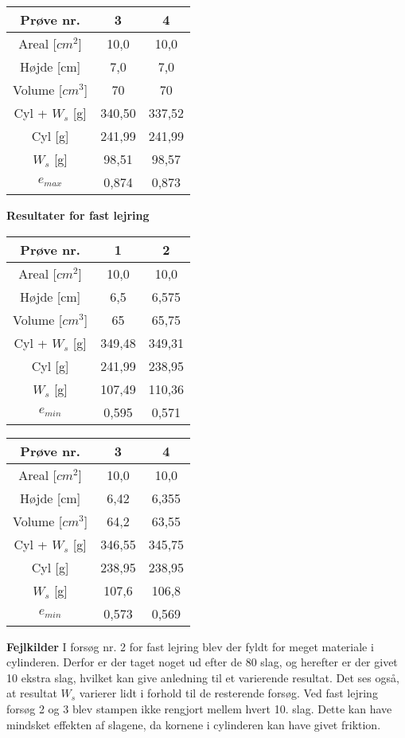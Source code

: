 \begin{center}
	\begin{tabular}{ |c|c|c| } 
		\hline
		Prøve nr. & 3 & 4 \\	\hline
		Areal [$cm^2$] & 10,0 & 10,0 \\ \hline
		Højde [cm] & 7,0 & 7,0 \\ \hline
		Volume [$cm^3$] & 70 & 70 \\ \hline
		Cyl + $W_s$ [g] & 340,50 & 337,52 \\ \hline
		Cyl [g] & 241,99 & 241,99 \\ \hline
		$W_s$ [g] & 98,51 & 98,57 \\ \hline
		$e_{max}$ & 0,874 & 0,873\\ \hline
	\end{tabular}
\end{center}

\textbf{Resultater for fast lejring}
\begin{center}
	\begin{tabular}{ |c|c|c| } 
		\hline
		Prøve nr. & 1 & 2 \\	\hline 
		Areal [$cm^2$] & 10,0 & 10,0 \\ \hline
		Højde [cm] & 6,5 & 6,575 \\ \hline
		Volume [$cm^3$] & 65 & 65,75 \\ \hline
		Cyl + $W_s$ [g] & 349,48 & 349,31 \\ \hline
		Cyl [g] & 241,99 & 238,95 \\ \hline
		$W_s$ [g] & 107,49 & 110,36 \\ \hline
		$e_{min}$ & 0,595 & 0,571 \\ \hline
	\end{tabular}
\end{center}

\begin{center}
	\begin{tabular}{ |c|c|c| } 
		\hline
		Prøve nr. & 3 & 4 \\	\hline
		Areal [$cm^2$] & 10,0 & 10,0 \\ \hline
		Højde [cm] & 6,42 & 6,355 \\ \hline
		Volume [$cm^3$] & 64,2 & 63,55 \\ \hline
		Cyl + $W_s$ [g] & 346,55 & 345,75 \\ \hline
		Cyl [g] & 238,95 & 238,95 \\ \hline
		$W_s$ [g] & 107,6 & 106,8 \\ \hline
		$e_{min}$ & 0,573 & 0,569 \\ \hline
	\end{tabular}
\end{center}

\textbf{Fejlkilder}
\newline
I forsøg nr. 2 for fast lejring blev der fyldt for meget materiale i cylinderen. Derfor er der taget noget ud efter de 80 slag, og herefter er der givet 10 ekstra slag, hvilket kan give anledning til et varierende resultat. Det ses også, at resultat $W_s$ varierer lidt i forhold til de resterende forsøg.
\newline \indent{     }  Ved fast lejring forsøg 2 og 3 blev stampen ikke rengjort mellem hvert 10. slag. Dette kan have mindsket effekten af slagene, da kornene i cylinderen kan have givet friktion.